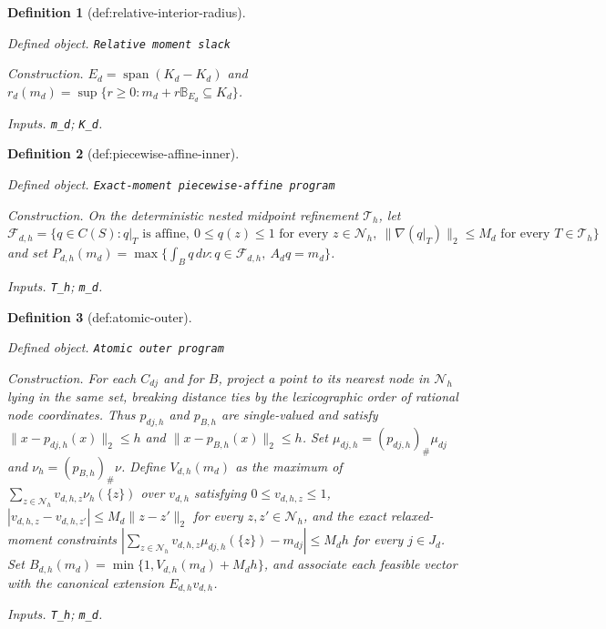 \documentclass{article}
\newtheorem{definition}{Definition}
\begin{document}
\begin{definition}[def:relative-interior-radius]\label{def:relative-interior-radius}
\par\smallskip\noindent\emph{Defined object.} \texttt{Relative moment slack}
\par\smallskip\noindent\emph{Construction.} \(E_d=\operatorname{span}(K_d-K_d)\) and \(r_d(m_d)=\sup\{r\ge0:m_d+r\mathbb B_{E_d}\subseteq K_d\}\).
\par\smallskip\noindent\emph{Inputs.} \texttt{m\_\allowbreak{}d}; \texttt{K\_\allowbreak{}d}.
\end{definition}

\begin{definition}[def:piecewise-affine-inner]\label{def:piecewise-affine-inner}
\par\smallskip\noindent\emph{Defined object.} \texttt{Exact-\allowbreak{}moment piecewise-\allowbreak{}affine program}
\par\smallskip\noindent\emph{Construction.} On the deterministic nested midpoint refinement \(\mathcal T_h\), let \(\mathcal F_{d,h}=\{q\in C(S):q|_T\text{ is affine},\ 0\le q(z)\le1\text{ for every }z\in\mathcal N_h,\ \|\nabla(q|_T)\|_2\le M_d\text{ for every }T\in\mathcal T_h\}\) and set \(P_{d,h}(m_d)=\max\{\int_Bq\,d\nu:q\in\mathcal F_{d,h},\ A_dq=m_d\}\).
\par\smallskip\noindent\emph{Inputs.} \texttt{T\_\allowbreak{}h}; \texttt{m\_\allowbreak{}d}.
\end{definition}

\begin{definition}[def:atomic-outer]\label{def:atomic-outer}
\par\smallskip\noindent\emph{Defined object.} \texttt{Atomic outer program}
\par\smallskip\noindent\emph{Construction.} For each \(C_{dj}\) and for \(B\), project a point to its nearest node in \(\mathcal N_h\) lying in the same set, breaking distance ties by the lexicographic order of rational node coordinates. Thus \(p_{dj,h}\) and \(p_{B,h}\) are single-valued and satisfy \(\|x-p_{dj,h}(x)\|_2\le h\) and \(\|x-p_{B,h}(x)\|_2\le h\). Set \(\mu_{dj,h}=(p_{dj,h})_\#\mu_{dj}\) and \(\nu_h=(p_{B,h})_\#\nu\). Define \(V_{d,h}(m_d)\) as the maximum of \(\sum_{z\in\mathcal N_h}v_{d,h,z}\nu_h(\{z\})\) over \(v_{d,h}\) satisfying \(0\le v_{d,h,z}\le1\), \(|v_{d,h,z}-v_{d,h,z'}|\le M_d\|z-z'\|_2\) for every \(z,z'\in\mathcal N_h\), and the exact relaxed-moment constraints \(\left|\sum_{z\in\mathcal N_h}v_{d,h,z}\mu_{dj,h}(\{z\})-m_{dj}\right|\le M_dh\) for every \(j\in J_d\). Set \(B_{d,h}(m_d)=\min\{1,V_{d,h}(m_d)+M_dh\}\), and associate each feasible vector with the canonical extension \(E_{d,h}v_{d,h}\).
\par\smallskip\noindent\emph{Inputs.} \texttt{T\_\allowbreak{}h}; \texttt{m\_\allowbreak{}d}.
\end{definition}
\end{document}
